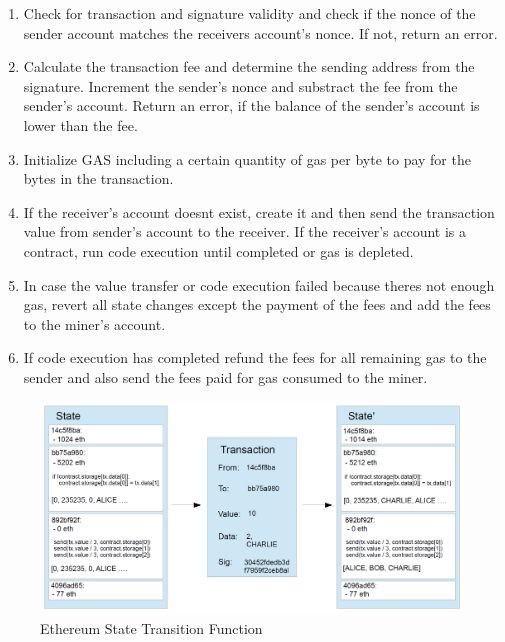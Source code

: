 \begin{enumerate}
	\item Check for transaction and signature validity and check if the nonce of the sender account matches the receivers account's nonce. If not, return an error.
	\item Calculate the transaction fee and determine the sending address from the signature. Increment the sender's nonce and substract the fee from the sender's account. Return an error, if the balance of the sender's account is lower than the fee.
	\item Initialize GAS including a certain quantity of gas per byte to pay for the bytes in the transaction.
	\item If the receiver's account doesnt exist, create it and then send the transaction value from sender's account to the receiver. If the receiver's account is a contract, run code execution until completed or gas is depleted.
	\item In case the value transfer or code execution failed because theres not enough gas, revert all state changes except the payment of the fees and add the fees to the miner's account.
	\item If code execution has completed refund the fees for all remaining gas to the sender and also send the fees paid for gas consumed to the miner.
\end{enumerate}


\begin{figure}[h]
	\includegraphics[width=14cm]{ethereum_state_transition_function}	%
	\caption{Ethereum State Transition Function}
	\label{fig:ethereum_state_transition_function}
\end{figure}

